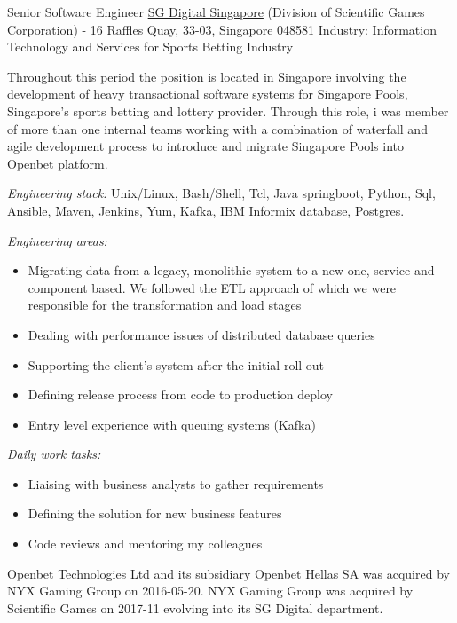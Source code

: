 \documentclass[arial, english, nologo, notitle, totpages]{europecv2013}
\begin{document}
\begin{europecv}
	{Senior Software Engineer}
    {\href{https://www.sgdigital.com/}{SG Digital Singapore} {\tiny(Division of Scientific Games Corporation) - 16 Raffles Quay, 33-03, Singapore 048581}}
    {Industry: Information Technology and Services for Sports Betting Industry}
    {
    \begin{small}
    	Throughout this period the position is located in Singapore involving the development of heavy transactional software systems for Singapore Pools, Singapore's sports betting and lottery provider. Through this role, i was member of more than one internal teams working with a combination of waterfall and agile development process to introduce and migrate Singapore Pools into Openbet platform.
    	\begin{flushleft}
    		\textit{Engineering stack:} Unix/Linux, Bash/Shell, Tcl, Java springboot, Python, Sql, Ansible, Maven, Jenkins, Yum, Kafka, IBM Informix database, Postgres.
    	\end{flushleft}
    	\textit{Engineering areas:}
    	\begin{itemize}[label=\raisebox{0.25ex}{\tiny$\bullet$}, leftmargin=+1.0cm]
			\item Migrating data from a legacy, monolithic system to a new one, service and component based. We followed the ETL approach of which we were responsible for the transformation and load stages
			\item Dealing with performance issues of distributed database queries
			\item Supporting the client's system after the initial roll-out
			\item Defining release process from code to production deploy
			\item Entry level experience with queuing systems (Kafka)
		\end{itemize}
        \textit{Daily work tasks:}
    	\begin{itemize}[label=\raisebox{0.25ex}{\tiny$\bullet$}, leftmargin=+1.0cm]
			\item Liaising with business analysts to gather requirements
			\item Defining the solution for new business features
			\item Code reviews and mentoring my colleagues
		\end{itemize}

   		Openbet Technologies Ltd and its subsidiary Openbet Hellas SA was acquired by NYX Gaming Group on 2016-05-20. NYX Gaming Group was acquired by Scientific Games on 2017-11 evolving into its SG Digital department.
    \end{small}
    }


\end{europecv}
\end{document}
